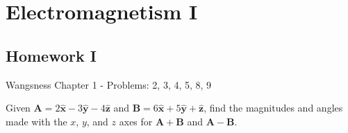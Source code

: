\documentclass[crop=false,class=article,oneside]{standalone}
\begin{document}
    \ifx\ifphysicscourseselectromagnetismI\undefined
        \section*{Electromagnetism I}
        \setcounter{section}{1}
    \fi
    \subsection{Homework I}
        Wangsness Chapter 1 - Problems: 2, 3, 4, 5, 8, 9
        \begin{problem}[Wangsness 1-2]
            Given
            $\mathbf{A}%
             =2\hat{\mathbf{x}}-3\hat{\mathbf{y}}%
             -4\hat{\mathbf{z}}$
            and
            $\mathbf{B}%
             =6\hat{\mathbf{x}}+5\hat{\mathbf{y}}%
             +\hat{\mathbf{z}}$,
            find the magnitudes and angles made with the $x$,
            $y$, and $z$ axes for
            $\mathbf{A}+\mathbf{B}$ and $\mathbf{A}-\mathbf{B}$.
        \end{problem}
\end{document}
